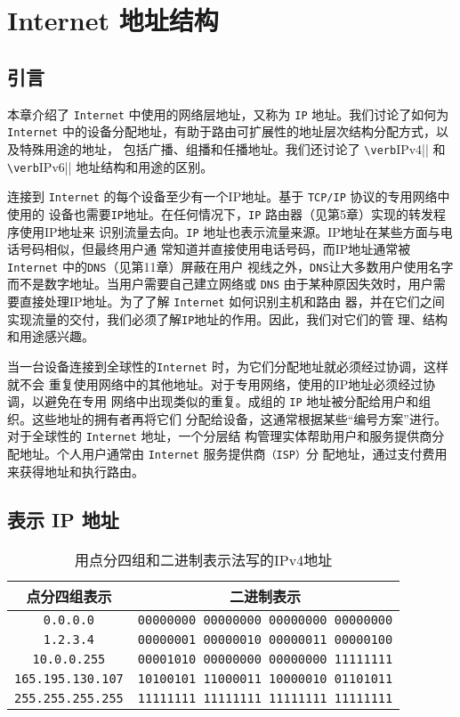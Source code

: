 \chapter{ Internet 地址结构}

\section{引言}
本章介绍了 \verb|Internet| 中使用的网络层地址，又称为 \verb|IP| 地址。我们讨论了如何为 \verb|Internet|
中的设备分配地址，有助于路由可扩展性的地址层次结构分配方式，以及特殊用途的地址，
包括广播、组播和任播地址。我们还讨论了 \verb|\verb|IPv4|| 和 \verb|\verb|IPv6|| 地址结构和用途的区别。

连接到 \verb|Internet| 的每个设备至少有一个IP地址。基于 \verb|TCP/IP| 协议的专用网络中使用的
设备也需要\verb|IP|地址。在任何情况下，\verb|IP| 路由器（见第5章）实现的转发程序使用IP地址来
识别流量去向。\verb|IP| 地址也表示流量来源。IP地址在某些方面与电话号码相似，但最终用户通
常知道并直接使用电话号码，而IP地址通常被 \verb|Internet| 中的\verb|DNS|（见第11章）屏蔽在用户
视线之外，\verb|DNS|让大多数用户使用名字而不是数字地址。当用户需要自己建立网络或 \verb|DNS|
由于某种原因失效时，用户需要直接处理IP地址。为了了解 \verb|Internet| 如何识别主机和路由
器，并在它们之间实现流量的交付，我们必须了解\verb|IP|地址的作用。因此，我们对它们的管
理、结构和用途感兴趣。

当一台设备连接到全球性的\verb|Internet| 时，为它们分配地址就必须经过协调，这样就不会
重复使用网络中的其他地址。对于专用网络，使用的IP地址必须经过协调，以避免在专用
网络中出现类似的重复。成组的 \verb|IP| 地址被分配给用户和组织。这些地址的拥有者再将它们
分配给设备，这通常根据某些“编号方案”进行。对于全球性的 \verb|Internet| 地址，一个分层结
构管理实体帮助用户和服务提供商分配地址。个人用户通常由 \verb|Internet| 服务提供商\verb|（ISP）|分
配地址，通过支付费用来获得地址和执行路由。

\section{表示 IP 地址}

\begin{table}[H]
    \centering
    \label{tab:2.1}
    \caption{用点分四组和二进制表示法写的IPv4地址}
    \begin{tabular}{|c|c|}
        \hline
        点分四组表示             &                    二进制表示                \\ \hline
        \verb|0.0.0.0|         & \verb|00000000 00000000 00000000 00000000| \\ \hline
        \verb|1.2.3.4|         & \verb|00000001 00000010 00000011 00000100| \\ \hline
        \verb|10.0.0.255|      & \verb|00001010 00000000 00000000 11111111| \\ \hline
        \verb|165.195.130.107| & \verb|10100101 11000011 10000010 01101011| \\ \hline
        \verb|255.255.255.255| & \verb|11111111 11111111 11111111 11111111| \\ \hline
    \end{tabular}
\end{table}

